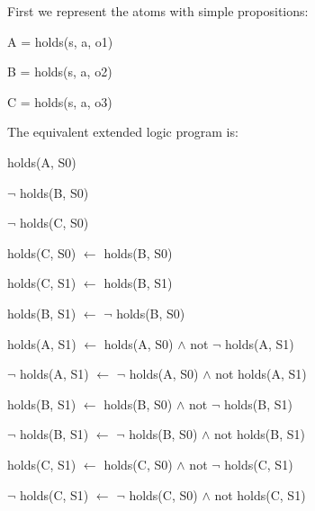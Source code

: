 \documentclass[a4paper]{article}
\begin{document}
        First we represent the atoms with simple propositions:

        \begin{list}{}{}
          \item A = holds(s, a, o1)
          \item B = holds(s, a, o2)
          \item C = holds(s, a, o3)
        \end{list}

        The equivalent extended logic program is:

        \begin{list}{}{Initial State}
          \item holds(A, S0)
          \item $\lnot$ holds(B, S0)
          \item $\lnot$ holds(C, S0)
        \end{list}

        \begin{list}{}{Constraint}
          \item holds(C, S0) $\leftarrow$ holds(B, S0)
          \item holds(C, S1) $\leftarrow$ holds(B, S1)
        \end{list}

        \begin{list}{}{Transformation}
          \item holds(B, S1) $\leftarrow$ $\lnot$ holds(B, S0)
        \end{list}

        \begin{list}{}{Inertial Rules}
          \item
            holds(A, S1) $\leftarrow$ holds(A, S0) $\land$ not $\lnot$ holds(A, S1)
          \item
            $\lnot$ holds(A, S1) $\leftarrow$ $\lnot$ holds(A, S0) $\land$ not holds(A, S1)
          \item
            holds(B, S1) $\leftarrow$ holds(B, S0) $\land$ not $\lnot$ holds(B, S1)
          \item
            $\lnot$ holds(B, S1) $\leftarrow$ $\lnot$ holds(B, S0) $\land$ not holds(B, S1)
          \item
            holds(C, S1) $\leftarrow$ holds(C, S0) $\land$ not $\lnot$ holds(C, S1)
          \item
            $\lnot$ holds(C, S1) $\leftarrow$ $\lnot$ holds(C, S0) $\land$ not holds(C, S1)
        \end{list}
\end{document}
